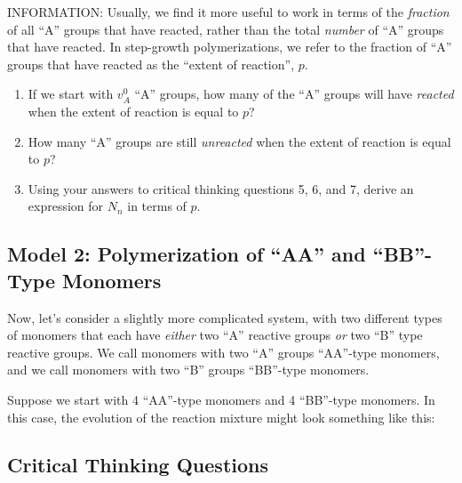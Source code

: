 	INFORMATION: Usually, we find it more useful to work in terms of the \emph{fraction} of all ``A'' groups that have reacted, rather than the total \emph{number} of ``A'' groups that have reacted.  In step-growth polymerizations, we refer to the fraction of ``A'' groups that have reacted as the ``extent of reaction'', $p$.
	
	\begin{enumerate}
		\item If we start with $v_A^0$ ``A'' groups, how many of the ``A'' groups will have \emph{reacted} when the extent of reaction is equal to $p$?
		
		\item How many ``A'' groups are still \emph{unreacted} when the extent of reaction is equal to $p$?
		
		\item Using your answers to critical thinking questions 5, 6, and 7, derive an expression for $N_n$ in terms of $p$.
		
	\end{enumerate}

\subsection{Model 2: Polymerization of ``AA'' and ``BB''-Type Monomers}

Now, let's consider a slightly more complicated system, with two different types of monomers that each have \emph{either} two ``A'' reactive groups \emph{or} two ``B'' type reactive groups.
We call monomers with two ``A'' groups ``AA''-type monomers, and we call monomers with two ``B'' groups ``BB''-type monomers.

Suppose we start with 4 ``AA''-type monomers and 4 ``BB''-type monomers.
In this case, the evolution of the reaction mixture might look something like this:

\subsection{Critical Thinking Questions}

